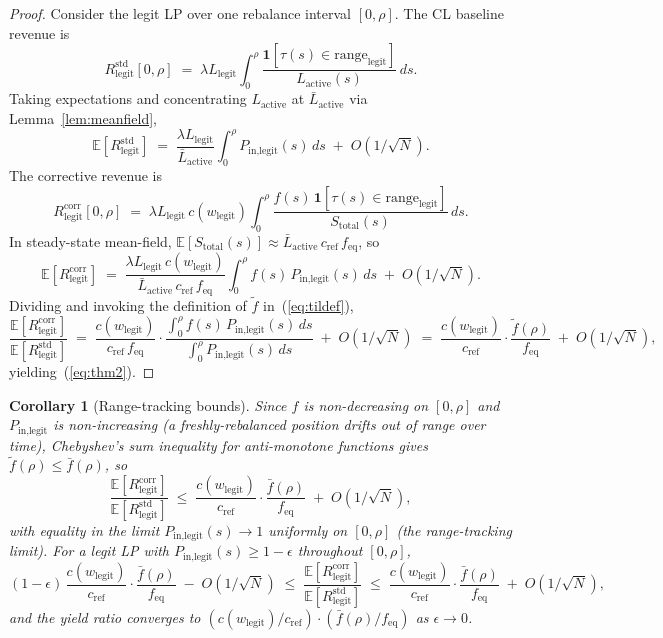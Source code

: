 \documentclass[11pt,a4paper]{article}
\theoremstyle{cgdefinition}
\theoremstyle{cgplain}
\newtheorem{corollary}{Corollary}
\theoremstyle{cgremark}
\begin{document}
\begin{proof}
Consider the legit LP over one rebalance interval $[0, \rho]$. The CL baseline revenue is
\[
R^{\text{std}}_{\text{legit}}[0, \rho] \;=\; \lambda L_{\text{legit}} \int_0^\rho \frac{\mathbf{1}[\tau(s) \in \text{range}_{\text{legit}}]}{L_{\text{active}}(s)}\,ds.
\]
Taking expectations and concentrating $L_{\text{active}}$ at $\bar L_{\text{active}}$ via Lemma~\ref{lem:meanfield},
\[
\mathbb{E}[R^{\text{std}}_{\text{legit}}] \;=\; \frac{\lambda L_{\text{legit}}}{\bar L_{\text{active}}} \int_0^\rho P_{\text{in,legit}}(s)\,ds \;+\; O(1/\sqrt N).
\]
The corrective revenue is
\[
R^{\text{corr}}_{\text{legit}}[0, \rho] \;=\; \lambda L_{\text{legit}}\,c(w_{\text{legit}}) \int_0^\rho \frac{f(s)\,\mathbf{1}[\tau(s) \in \text{range}_{\text{legit}}]}{S_{\text{total}}(s)}\,ds.
\]
In steady-state mean-field, $\mathbb{E}[S_{\text{total}}(s)] \approx \bar L_{\text{active}}\,c_{\text{ref}}\,f_{\text{eq}}$, so
\[
\mathbb{E}[R^{\text{corr}}_{\text{legit}}] \;=\; \frac{\lambda L_{\text{legit}}\,c(w_{\text{legit}})}{\bar L_{\text{active}}\,c_{\text{ref}}\,f_{\text{eq}}} \int_0^\rho f(s)\,P_{\text{in,legit}}(s)\,ds \;+\; O(1/\sqrt N).
\]
Dividing and invoking the definition of $\tilde f$ in~(\ref{eq:tildef}),
\[
\frac{\mathbb{E}[R^{\text{corr}}_{\text{legit}}]}{\mathbb{E}[R^{\text{std}}_{\text{legit}}]} \;=\; \frac{c(w_{\text{legit}})}{c_{\text{ref}}\, f_{\text{eq}}} \cdot \frac{\int_0^\rho f(s)\,P_{\text{in,legit}}(s)\,ds}{\int_0^\rho P_{\text{in,legit}}(s)\,ds} \;+\; O(1/\sqrt N) \;=\; \frac{c(w_{\text{legit}})}{c_{\text{ref}}} \cdot \frac{\tilde f(\rho)}{f_{\text{eq}}} \;+\; O(1/\sqrt N),
\]
yielding~(\ref{eq:thm2}).
\end{proof}

\begin{corollary}[Range-tracking bounds]\label{cor:rangetracking}
Since $f$ is non-decreasing on $[0, \rho]$ and $P_{\text{in,legit}}$ is non-increasing (a freshly-rebalanced position drifts out of range over time), Chebyshev's sum inequality for anti-monotone functions gives $\tilde f(\rho) \leq \bar f(\rho)$, so
\begin{equation}\label{eq:thm2upper}
\frac{\mathbb{E}[R^{\text{corr}}_{\text{legit}}]}{\mathbb{E}[R^{\text{std}}_{\text{legit}}]} \;\leq\; \frac{c(w_{\text{legit}})}{c_{\text{ref}}} \cdot \frac{\bar f(\rho)}{f_{\text{eq}}} \;+\; O(1/\sqrt N),
\end{equation}
with equality in the limit $P_{\text{in,legit}}(s) \to 1$ uniformly on $[0, \rho]$ (the range-tracking limit). For a legit LP with $P_{\text{in,legit}}(s) \geq 1 - \epsilon$ throughout $[0, \rho]$,
\begin{equation}\label{eq:thm2lower}
(1 - \epsilon)\,\frac{c(w_{\text{legit}})}{c_{\text{ref}}} \cdot \frac{\bar f(\rho)}{f_{\text{eq}}} \;-\; O(1/\sqrt N) \;\leq\; \frac{\mathbb{E}[R^{\text{corr}}_{\text{legit}}]}{\mathbb{E}[R^{\text{std}}_{\text{legit}}]} \;\leq\; \frac{c(w_{\text{legit}})}{c_{\text{ref}}} \cdot \frac{\bar f(\rho)}{f_{\text{eq}}} \;+\; O(1/\sqrt N),
\end{equation}
and the yield ratio converges to $(c(w_{\text{legit}})/c_{\text{ref}}) \cdot (\bar f(\rho)/f_{\text{eq}})$ as $\epsilon \to 0$.
\end{corollary}
\end{document}
